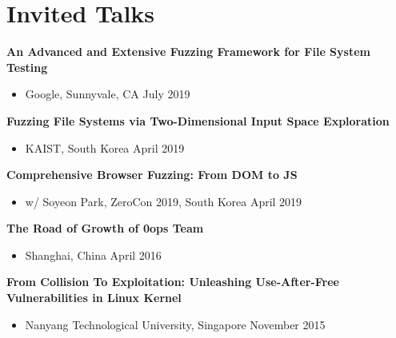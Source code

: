 \section*{Invited Talks}
\begin{description}

    \item \textbf{An Advanced and Extensive Fuzzing Framework for File System Testing}
        \begin{itemize}
            \item Google, Sunnyvale, CA \dotfill July 2019
        \end{itemize}

    \item \textbf{Fuzzing File Systems via Two-Dimensional Input Space Exploration}
        \begin{itemize}
            \item KAIST, South Korea \dotfill April 2019
        \end{itemize}

	\item \textbf{Comprehensive Browser Fuzzing: From DOM to JS}
      \begin{itemize}
          \item w/ Soyeon Park, ZeroCon 2019, South Korea \dotfill April 2019
      \end{itemize}

	\item \textbf{The Road of Growth of 0ops Team}
      \begin{itemize}
          \item Shanghai, China \dotfill April 2016
      \end{itemize}

	\item \textbf{From Collision To Exploitation: Unleashing Use-After-Free Vulnerabilities in Linux Kernel}
		\begin{itemize}
			\item Nanyang Technological University, Singapore \dotfill November 2015
		\end{itemize}

\end{description}

